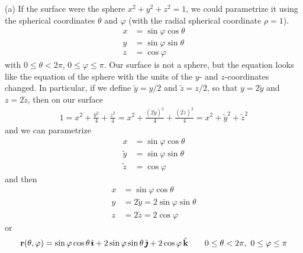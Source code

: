 \begin{solution} (a)
If the surface were the sphere $x^2+y^2+z^2=1$, we could parametrize 
it using the spherical coordinates  $\theta$ and $\varphi$ (with the radial 
spherical coordinate $\rho=1$).
\begin{align*}
x&=\sin\varphi\cos\theta \\
y&=\sin\varphi\sin\theta \\
z&=\cos\varphi
\end{align*}
with $0\le\theta<2\pi$, $0\le \varphi \le \pi$. Our surface is not a sphere,
but the equation looks like the equation of the sphere with the units of the
$y$- and $z$-coordinates changed. In particular, if we define $\tilde y =y/2$
and $\tilde z =z/2$, so that $y=2\tilde y$ and $z=2\tilde z$, then on our
surface
\begin{align*}
1=x^2 + \frac{y^2}{4} +\frac{z^2}{4} 
 =x^2 + \frac{(2\tilde y)^2}{4} +\frac{(2\tilde z)^2}{4}
 =x^2+\tilde y^2 +\tilde z^2 
\end{align*}
and we can parametrize
\begin{align*}
x&=\sin\varphi\cos\theta \\
\tilde y&=\sin\varphi\sin\theta \\
\tilde z&=\cos\varphi
\end{align*}
and then
\begin{align*}
x&=\sin\varphi\cos\theta \\
y&=2\tilde y=2\sin\varphi\sin\theta \\
z&=2\tilde z=2\cos\varphi
\end{align*}
or
\begin{align*}
\mathbf{r}(\theta,\varphi)
=\sin\varphi\cos\theta\,\hat{\pmb{\imath}}
  +2\sin\varphi\sin\theta\,\hat{\pmb{\jmath}}
  +2\cos\varphi\,\hat{\mathbf{k}}\qquad
0\le\theta<2\pi,\ 0\le \varphi \le \pi
\end{align*}


\end{solution}
